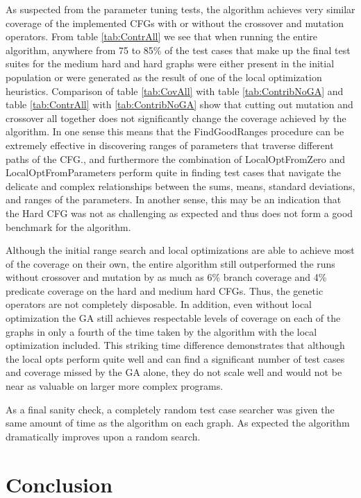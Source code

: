 \documentclass[runningheads]{llncs}
\begin{document}
As suspected from the parameter tuning tests, the algorithm achieves very similar coverage of the implemented CFGs with or without the crossover and mutation operators. From table \ref{tab:ContrAll} we see that when running the entire algorithm, anywhere from 75 to 85\% of the test cases that make up the final test suites for the medium hard and hard graphs were either present in the initial population or were generated as the result of one of the local optimization heuristics. Comparison of table \ref{tab:CovAll} with table \ref{tab:ContribNoGA} and table \ref{tab:ContrAll} with \ref{tab:ContribNoGA} show that cutting out mutation and crossover all together does not significantly change the coverage achieved by the algorithm. In one sense this means that the FindGoodRanges procedure can be extremely effective in discovering ranges of parameters that traverse different paths of the CFG., and furthermore the combination of LocalOptFromZero and LocalOptFromParameters perform quite in finding test cases that navigate the delicate and complex relationships between the sums, means, standard deviations, and ranges of the parameters. In another sense, this may be an indication that the Hard CFG was not as challenging as expected and thus does not form a good benchmark for the algorithm.

Although the initial range search and local optimizations are able to achieve most of the coverage on their own, the entire algorithm still outperformed the runs without crossover and mutation by as much as 6\% branch coverage and 4\% predicate coverage on the hard and medium hard CFGs. Thus, the genetic operators are not completely disposable. In addition, even without local optimization the GA still achieves respectable levels of coverage on each of the graphs in only a fourth of the time taken by the algorithm with the local optimization included. This striking time difference demonstrates that although the local opts perform quite well and can find a significant number of test cases and coverage missed by the GA alone, they do not scale well and would not be near as valuable on larger more complex programs. 

As a final sanity check, a completely random test case searcher was given the same amount of time as the algorithm on each graph. As expected the algorithm dramatically improves upon a random search.
 

\newpage
\section{Conclusion}
\end{document}
